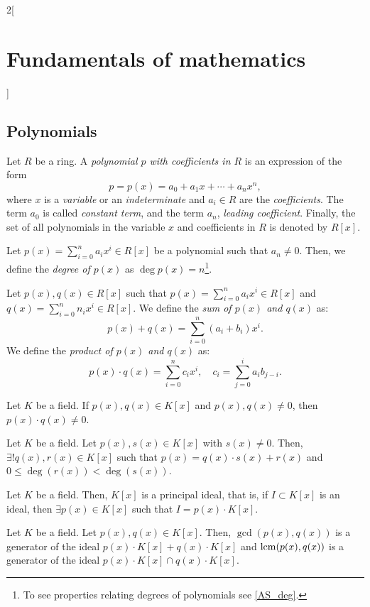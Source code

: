 \documentclass[../../../main.tex]{subfiles}
\begin{document}
\begin{multicols}{2}[\section{Fundamentals of mathematics}]
  \subsection{Polynomials}
  \begin{definition}
    Let $R$ be a ring. A \textit{polynomial $p$ with coefficients in $R$} is an expression of the form $$p=p(x)=a_0+a_1x+\cdots+a_nx^n,$$ where $x$ is a \textit{variable} or an \textit{indeterminate} and $a_i\in R$ are the \textit{coefficients}. The term $a_0$ is called \textit{constant term}, and the term $a_n$, \textit{leading coefficient}. Finally, the set of all polynomials in the variable $x$ and coefficients in $R$ is denoted by $R[x]$.
  \end{definition}
  \begin{definition}
    Let $p(x)=\sum_{i=0}^na_ix^i\in R[x]$ be a polynomial such that $a_n\ne 0$. Then, we define the \textit{degree of $p(x)$} as $\deg p(x)=n$\footnote{To see properties relating degrees of polynomials see \cref{AS_deg}.}.
  \end{definition}
  \begin{definition}
    Let $p(x),q(x)\in R[x]$ such that $p(x)=\sum_{i=0}^na_ix^i\in R[x]$ and $q(x)=\sum_{i=0}^nn_ix^i\in R[x]$. We define the \textit{sum of $p(x)$ and $q(x)$} as: $$p(x)+q(x)=\sum_{i=0}^n(a_i+b_i)x^i.$$
    We define the \textit{product of $p(x)$ and $q(x)$} as: $$p(x)\cdot q(x)=\sum_{i=0}^nc_ix^i,\quad c_i=\sum_{j=0}^ia_ib_{j-i}.$$
  \end{definition}
  \begin{prop}
    Let $K$ be a field. If $p(x),q(x)\in K[x]$ and $p(x),q(x)\ne 0$, then $p(x)\cdot q(x)\ne 0$.
  \end{prop}
  \begin{theorem}
    Let $K$ be a field. Let $p(x),s(x)\in K[x]$ with $s(x)\ne 0$. Then, $\exists! q(x),r(x)\in K[x]$ such that $p(x)=q(x)\cdot s(x)+r(x)$ and $0\leq\deg(r(x))<\deg(s(x))$.
  \end{theorem}
  \begin{theorem}
    Let $K$ be a field. Then, $K[x]$ is a principal ideal, that is, if $I\subset K[x]$ is an ideal, then $\exists p(x)\in K[x]$ such that $I=p(x)\cdot K[x]$.
  \end{theorem}
  \begin{definition}
    Let $K$ be a field. Let $p(x),q(x)\in K[x]$. Then, $\gcd(p(x),q(x))$ is a generator of the ideal $p(x)\cdot K[x]+q(x)\cdot K[x]$ and $\operatorname{lcm}(p(x),q(x))$ is a generator of the ideal $p(x)\cdot K[x]\cap q(x)\cdot K[x]$.

\end{definition}
\end{multicols}
\end{document}
